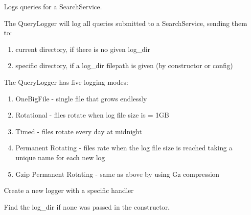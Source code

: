 \documentclass[letterpaper,10pt,english]{sphinxmanual}
\begin{document}
\begin{fulllineitems}
\label{api2.0:puppy.logging.QueryLogger}
Logs queries for a SearchService.

The QueryLogger will log all queries submitted to a SearchService, sending them to:
\begin{enumerate}
\item {} 
current directory, if there is no given log\_dir

\item {} 
specific directory, if a log\_dir filepath is given (by constructor or config)

\end{enumerate}

The QueryLogger has five logging modes:
\begin{enumerate}
\item {} 
OneBigFile - single file that grows endlessly

\item {} 
Rotational - files rotate when log file size is = 1GB

\item {} 
Timed - files rotate every day at midnight

\item {} 
Permanent Rotating - files rate when the log file size is reached taking a unique name for each new log

\item {} 
Gzip Permanent Rotating - same as above by using Gz compression

\end{enumerate}

\begin{fulllineitems}
\label{api2.0:puppy.logging.QueryLogger.create_logger}
Create a new logger with a specific handler

\end{fulllineitems}


\begin{fulllineitems}
\label{api2.0:puppy.logging.QueryLogger.get_log_dir}
Find the log\_dir if none was passed in the constructor.


\end{fulllineitems}
\end{fulllineitems}
\end{document}
